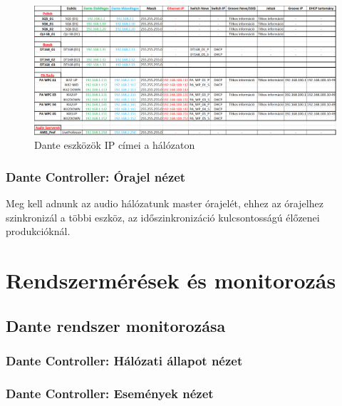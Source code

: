 \begin{figure}[!ht]
\centering
\includegraphics[width=150mm, keepaspectratio]{figures/dante_ips.png}
\caption{Dante eszközök IP címei a hálózaton}
\label{fig:dante_ips}
\end{figure}








\subsubsection{Dante Controller: Órajel nézet}

Meg kell adnunk az audio hálózatunk master órajelét, ehhez az órajelhez
szinkronizál a többi eszköz, az időszinkronizáció kulcsontosságú élőzenei
produkcióknál.



\section{Rendszermérések és monitorozás}




\subsection{Dante rendszer monitorozása}





\subsubsection{Dante Controller: Hálózati állapot nézet}





\subsubsection{Dante Controller: Események nézet}





